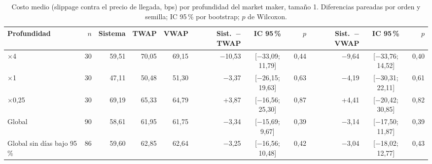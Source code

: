 \begin{table}[htbp]
\centering
\small
\setlength{\tabcolsep}{4pt}
\caption{Costo medio (slippage contra el precio de llegada, bps) por profundidad del market maker, tamaño 1. Diferencias pareadas por orden y semilla; IC 95\,\% por bootstrap; $p$ de Wilcoxon.}
\label{tab:resultados_profundidad}
\begin{tabular}{lrrrrrcrrcr}
\hline
Profundidad & $n$ & Sistema & TWAP & VWAP & Sist.\ $-$ TWAP & IC 95\,\% & $p$ & Sist.\ $-$ VWAP & IC 95\,\% & $p$ \\
\hline
$\times$4 & 30 & 59,51 & 70,05 & 69,15 & $-$10,53 & [$-$33,09; 11,79] & 0,44 & $-$9,64 & [$-$33,76; 14,52] & 0,40 \\
$\times$1 & 30 & 47,11 & 50,48 & 51,30 & $-$3,37 & [$-$26,15; 19,63] & 0,63 & $-$4,19 & [$-$30,31; 22,11] & 0,61 \\
$\times$0,25 & 30 & 69,19 & 65,33 & 64,79 & +3,87 & [$-$16,56; 25,30] & 0,87 & +4,41 & [$-$20,42; 30,85] & 0,82 \\
\hline
Global & 90 & 58,61 & 61,95 & 61,75 & $-$3,34 & [$-$15,69; 9,67] & 0,39 & $-$3,14 & [$-$17,50; 11,87] & 0,39 \\
Global sin días bajo 95 \% & 86 & 59,60 & 62,85 & 62,64 & $-$3,25 & [$-$16,56; 10,48] & 0,42 & $-$3,04 & [$-$18,02; 12,77] & 0,43 \\
\hline
\end{tabular}
\end{table}
